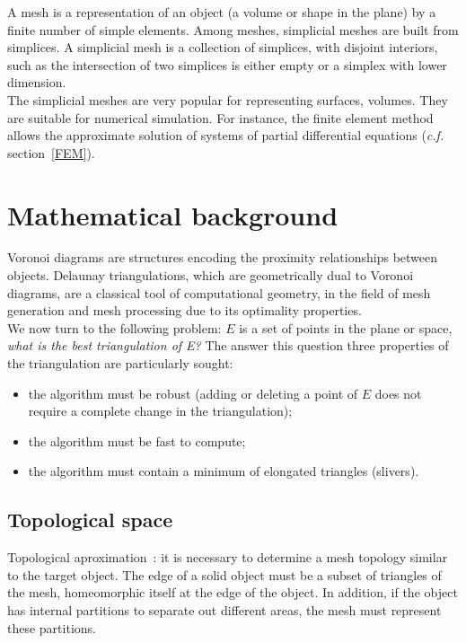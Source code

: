 A mesh is a representation of an object (a volume or shape in the plane) by a finite number of simple elements. Among meshes, simplicial meshes are built from simplices. A simplicial mesh is a collection of simplices, with disjoint interiors, such as the intersection of two simplices is either empty or a simplex with lower dimension. \\
The simplicial meshes are very popular for representing surfaces, volumes. They are suitable for numerical simulation. For instance, the finite element method allows the approximate solution of systems of partial differential equations ({\it c.f.} section~\ref{FEM}).


\section{Mathematical background}

Voronoi diagrams are structures encoding the proximity relationships between objects. Delaunay triangulations, which are geometrically dual to Voronoi diagrams, are a classical tool of computational geometry, in the field of mesh generation and mesh processing due to its optimality properties.\\
We now turn to the following problem: $E$ is a set of points in the plane or space, {\it what is the best triangulation of E?} The answer this question three properties of the triangulation are particularly sought: \\

\begin {itemize}
\item the algorithm must be robust (adding or deleting a point of $E$ does not require a complete change in the triangulation);
\item the algorithm must be fast to compute;
\item the algorithm must contain a minimum of elongated triangles (slivers). \\
\end {itemize}


\subsection{Topological space}

Topological aproximation~: it is necessary to determine a mesh topology similar to the target object. The edge of a solid object must be a subset of triangles of the mesh, homeomorphic itself at the edge of the object. In addition, if the object has internal partitions to separate out different areas, the mesh must represent these partitions.\\

